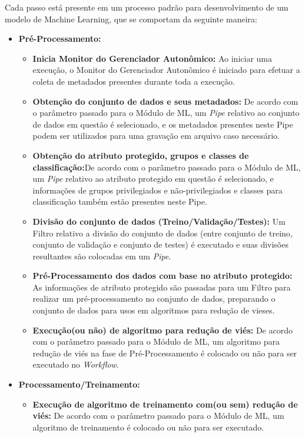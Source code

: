 \documentclass[portugues]{ic-tese}
\begin{document}
Cada passo está presente em um processo padrão para desenvolvimento de um modelo de Machine Learning, que se comportam da seguinte maneira:

\begin{itemize}
\item \textbf{Pré-Processamento:}
	\begin{itemize}
	\item \textbf{Inicia Monitor do Gerenciador Autonômico:} Ao iniciar uma execução, o Monitor do Gerenciador Autonômico é iniciado para efetuar a coleta de metadados presentes durante toda a execução.
	\item \textbf{Obtenção do conjunto de dados e seus metadados:} De acordo com o parâmetro passado para o Módulo de ML, um \textit{Pipe} relativo ao conjunto de dados em questão é selecionado, e os metadados presentes neste Pipe podem ser utilizados para uma gravação em arquivo caso necessário.
	\item \textbf{Obtenção do atributo protegido, grupos e classes de classificação:}De acordo com o parâmetro passado para o Módulo de ML, um \textit{Pipe} relativo ao atributo protegido em questão é selecionado, e informações de grupos privilegiados e não-privilegiados e classes para classificação também estão presentes neste Pipe.
	\item \textbf{Divisão do conjunto de dados (Treino/Validação/Testes):} Um Filtro relativo a divisão do conjunto de dados (entre conjunto de treino, conjunto de validação e conjunto de testes) é executado e suas divisões resultantes são colocadas em um \textit{Pipe}.
	\item \textbf{Pré-Processamento dos dados com base no atributo protegido:} As informações de atributo protegido são passadas para um Filtro para realizar um pré-processamento no conjunto de dados, preparando o conjunto de dados para usos em algoritmos para redução de vieses.
	\item \textbf{Execução(ou não) de algoritmo para redução de viés:} De acordo com o parâmetro passado para o Módulo de ML, um algoritmo para redução de viés na fase de Pré-Processamento é colocado ou não para ser executado no \textit{Workflow}. 
	\end{itemize}
\item \textbf{Processamento/Treinamento:}
	\begin{itemize}
	\item \textbf{Execução de algoritmo de treinamento com(ou sem) redução de viés:} De acordo com o parâmetro passado para o Módulo de ML, um algoritmo de treinamento é colocado ou não para ser executado.

\end{itemize}
\end{itemize}
\end{document}
